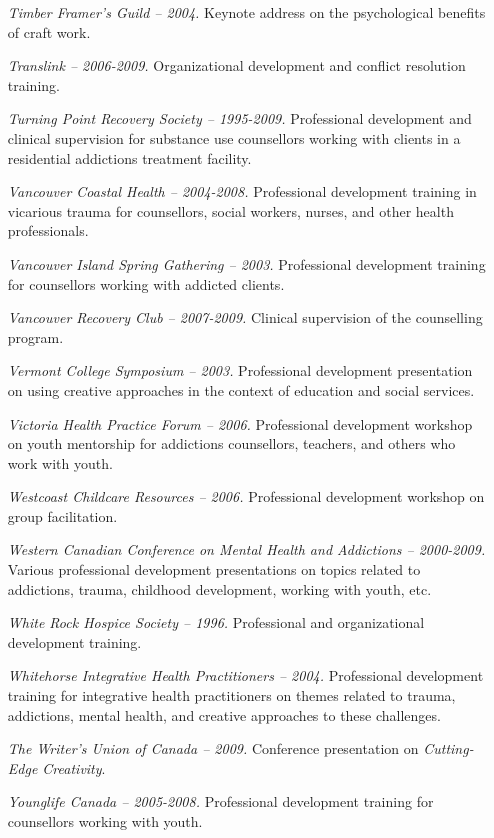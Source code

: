 \documentclass[10pt,DIV09,letterpaper,oneside,headsepline]{scrreprt}
\begin{document}
\begin{itemize}
\item [\textit{Timber Framer's Guild -- 2004.}]
Keynote address on the psychological benefits of craft work.

\item [\textit{Translink -- 2006-2009.}]
Organizational development and conflict resolution training.

\item [\textit{Turning Point Recovery Society -- 1995-2009.}]
Professional development and clinical supervision for substance use counsellors working with clients in a residential addictions treatment facility.

\item [\textit{Vancouver Coastal Health -- 2004-2008.}]
Professional development training in vicarious trauma for counsellors, social workers, nurses, and other health professionals.

\item [\textit{Vancouver Island Spring Gathering -- 2003.}]
Professional development training for counsellors working with addicted clients.

\item [\textit{Vancouver Recovery Club -- 2007-2009.}]
Clinical supervision of the counselling program.

\item [\textit{Vermont College Symposium -- 2003.}]
Professional development presentation on using creative approaches in the context of education and social services.

\item [\textit{Victoria Health Practice Forum -- 2006.}]
Professional development workshop on youth mentorship for addictions counsellors, teachers, and others who work with youth.

\item [\textit{Westcoast Childcare Resources -- 2006.}]
Professional development workshop on group facilitation.

\item [\textit{Western Canadian Conference on Mental Health and Addictions -- 2000-2009.}]
Various professional development presentations on topics related to addictions, trauma, childhood development, working with youth, etc.

\item [\textit{White Rock Hospice Society -- 1996.}]
Professional and organizational development training.

\item [\textit{Whitehorse Integrative Health Practitioners -- 2004.}]
Professional development training for integrative health practitioners on themes related to trauma, addictions, mental health, and creative approaches to these challenges.

\item [\textit{The Writer's Union of Canada -- 2009.}]
Conference presentation on \textit{Cutting-Edge Creativity}.

\item [\textit{Younglife Canada -- 2005-2008.}]
Professional development training for counsellors working with youth.

\end{itemize}
\end{document}

